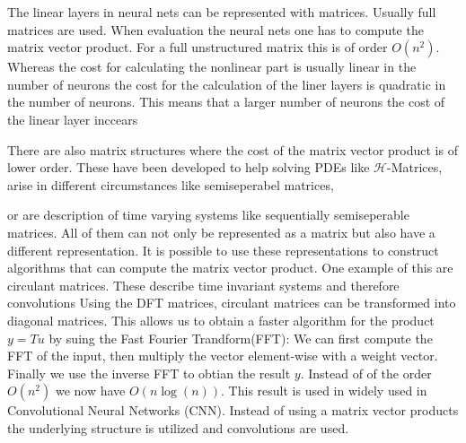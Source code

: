 \documentclass[doctype=mastersthesis,BCOR=15mm,biblatex]{ldvbook}%
\newcommand{\bigO}{O}
\begin{document}
The linear layers in neural nets can be represented with matrices.
Usually full matrices are used.
When evaluation the neural nets one has to compute the matrix vector product.
For a full unstructured matrix this is of order $O(n^2)$. 
Whereas the cost for calculating the nonlinear part is usually linear in the number of neurons the cost for the calculation of the liner layers is quadratic in the number of neurons.
This means that a larger number of neurons the cost of the linear layer inccears 


There are also matrix structures where the cost of the matrix vector product is of lower order.
These have been developed to help solving PDEs like $\mathcal{H}$-Matrices, arise in different circumstances like semiseperabel matrices, %

or are description of time varying systems like sequentially semiseperable matrices.
All of them can not only be represented as a matrix but also have a different representation.
It is possible to use these representations to construct algorithms that can compute the matrix vector product.
One example of this are circulant matrices. 
These describe time invariant systems and therefore convolutions 
Using the DFT matrices, circulant matrices can be transformed into diagonal matrices.
This allows us to obtain a faster algorithm for the product $y=Tu$ by suing the Fast Fourier Trandform(FFT):
We can first compute the FFT of the input, then multiply the vector element-wise with a weight vector. Finally we use the inverse FFT to obtian the result $y$.
Instead of of the order $\bigO(n^2)$ we now have $\bigO(n\log(n))$.
This result is used in widely used in Convolutional Neural Networks (CNN).
Instead of using a matrix vector products the underlying structure is utilized and convolutions are used.
\end{document}
